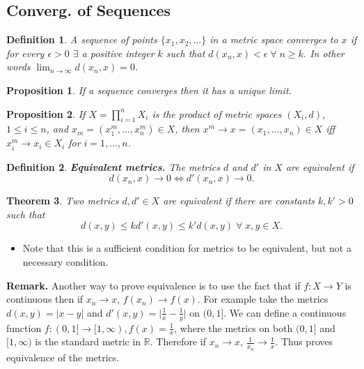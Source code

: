 \documentclass[two column]{article}
\newtheorem{theorem}{Theorem}[subsection]
\newtheorem{proposition}[theorem]{Proposition}
\newtheorem{definition}{Definition}[subsection]
\begin{document}
\subsection{Converg. of Sequences}

\begin{definition}
A sequence of points $\lbrace x_{1}, x_{2}, \dots \rbrace$ in a metric space converges to $x$ if for every $\epsilon >0$ $\exists$ a positive integer $k$ such that $d(x_{n}, x) < \epsilon \; \forall \; n \geq k$.  In other words $\lim_{n \rightarrow \infty} d(x_{n}, x) = 0$.\\ 
\end{definition}

\begin{proposition}
If a sequence converges then it has a unique limit.\\
\end{proposition}

\begin{proposition}
If $X = \prod_{i=1}^{n} X_{i}$ is the product of metric spaces $(X_{i},d)$, $1 \leq i \leq n$, and $x_{m} = (x_{1}^{m}, \dots , x_{n}^{m}) \in X$, then $x^{m} \rightarrow x = (x_{1}, \dots , x_{n}) \in X$ iff $x_{i}^{m} \rightarrow x_{i} \in X_{i}$ for $i = 1, \dots, n$. \\
\end{proposition}

\begin{definition}
{\bf Equivalent metrics.} The metrics $d$ and $d'$ in $X$ are equivalent if
\[ d(x_{n}, x) \rightarrow 0 \Leftrightarrow d'(x_{n}, x) \rightarrow 0. \]
\end{definition}

\begin{theorem}
Two metrics $d, d' \in X$ are equivalent if there are constants $k, k' > 0$ such that
\[ d(x,y) \leq kd'(x,y) \leq k'd(x,y) \; \forall \; x,y \in X. \] 
\end{theorem}
\begin{itemize}
\item Note that this is a sufficient condition for metrics to be equivalent, but not a necessary condition. 
\end{itemize}

{\bf Remark.} Another way to prove equivalence is to use the fact that if $f:X \rightarrow Y$ is continuous then if $x_{n}\rightarrow x$, $f(x_{n}) \rightarrow f(x)$. For example take the metrics $d(x,y) = \vert x - y \vert$ and $d'(x,y) = \vert \frac{1}{x} - \frac{1}{y} \vert$ on $(0,1]$. We can define a continuous function $f : (0,1] \rightarrow [1, \infty), f(x) = \frac{1}{x}$, where the metrics on both $(0,1]$ and $[1, \infty)$ is the standard metric in $\mathbb{R}$. Therefore if $x_{n}\rightarrow x$, $\frac{1}{x_{n}} \rightarrow \frac{1}{x}$. Thus proves equivalence of the metrics. 
\end{document}
